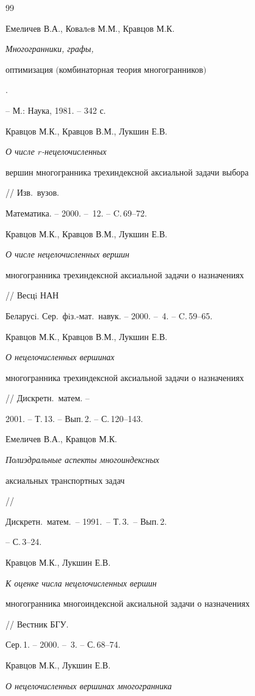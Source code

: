 \begin{thebibliography}{99}







Емеличев В.А., Ковалeв М.М., Кравцов М.К. {\it Многогранники, графы,


оптимизация $($комбинаторная теория многогранников$)$}.


-- М.: Наука, 1981. -- 342 с.




Кравцов М.К., Кравцов В.М., Лукшин Е.В. {\it О числе $r$-нецелочисленных


вершин многогранника трехиндексной аксиальной задачи выбора} // Изв.\ вузов.


Математика. -- 2000. -- \No\,12. -- C.\,69--72.




Кравцов М.К., Кравцов В.М., Лукшин Е.В. {\it О числе нецелочисленных вершин


многогранника трехиндексной аксиальной задачи о назначениях} // Весцi НАН


Беларусi. Сер.\ фiз.-мат.\ навук. -- 2000. -- \No\,4. -- C.\,59--65.




Кравцов М.К., Кравцов В.М., Лукшин Е.В. {\it О нецелочисленных вершинах


многогранника трехиндексной аксиальной задачи о назначениях}


// Дискретн.\ матем. --


2001. -- Т.\,13. -- Вып.\,2. -- С.\,120--143.




Емеличев В.А., Кравцов М.К. {\it Полиэдральные аспекты многоиндексных


аксиальных транспортных задач} //


Дискретн.\ матем.\ -- 1991.\ -- Т.\,3.\ -- Вып.\,2.\


-- С.\,3--24.




Кравцов М.К., Лукшин Е.В. {\it К оценке числа нецелочисленных вершин


многогранника многоиндексной аксиальной задачи о назначениях} // Вестник БГУ.


Сер.\,1. -- 2000. -- \No\,3. -- С.\,68--74.




Кравцов М.К., Лукшин Е.В. {\it О нецелочисленных вершинах многогранника


}
\end{thebibliography}
